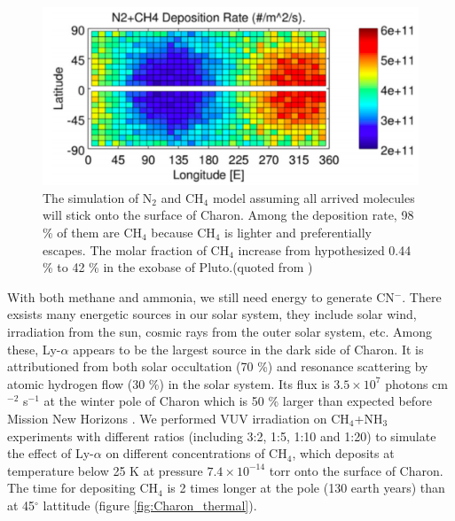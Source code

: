\begin{figure}
\centering
\includegraphics[width=\textwidth]{figures/chapter1/methane.png}
\caption{The simulation of N$_2$ and CH$_4$ model assuming all arrived molecules will stick onto the surface of Charon. Among the deposition rate, 98 \% of them are CH$_4$ because CH$_4$ is lighter and preferentially escapes. The molar fraction of CH$_4$ increase from hypothesized 0.44 \% to 42 \% in the exobase of Pluto.(quoted from \cite{hoey2017rarefied})}
\label{fig:Charon_distribution}
\end{figure}

With both methane and ammonia, we still need energy to generate CN$^-$. There exsists many energetic sources in our solar system, they include solar wind, irradiation from the sun, cosmic rays from the outer solar system, etc. Among these, Ly-$\alpha$ appears to be the largest source in the dark side of Charon. It is attributioned from both solar occultation (70 \%) and resonance scattering by atomic hydrogen flow (30 \%) in the solar system. Its flux is $3.5 \times 10^7$ photons cm$^{-2}$ s$^{-1}$ at the winter pole of Charon \cite{grundy2016formation} which is 50 \% larger than expected before Mission New Horizons \cite{gladstone2015lyalpha}. We performed VUV irradiation on CH$_4$+NH$_3$ experiments with different ratios (including 3:2, 1:5, 1:10 and 1:20) to simulate the effect of Ly-$\alpha$ on different concentrations of CH$_4$, which deposits at temperature below 25 K at pressure $7.4 \times 10^{-14}$ torr onto the surface of Charon. The time for depositing CH$_4$ is 2 times longer at the pole (130 earth years) than at 45$^{\circ}$ lattitude \cite{grundy2016formation} (figure \ref{fig:Charon_thermal}).

